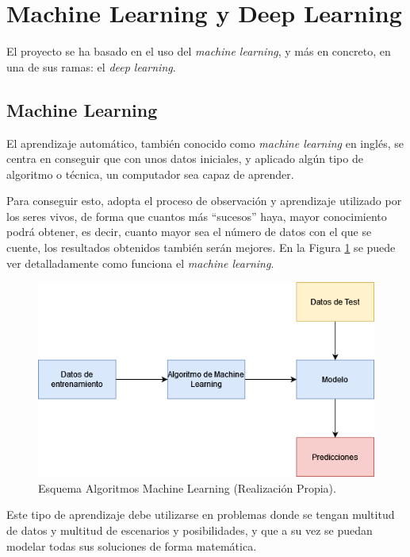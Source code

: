 
\section{Machine Learning y Deep Learning}
El proyecto se ha basado en el uso del \emph{machine learning}, y más en concreto, en una de sus ramas: el \emph{deep learning}.

\subsection{Machine Learning}
El aprendizaje automático, también conocido como \emph{machine learning} en inglés, \cite{bobadilla2021machine} se centra en conseguir que con unos datos iniciales, y aplicado algún tipo de algoritmo o técnica, un computador sea capaz de aprender.

Para conseguir esto, adopta el proceso de observación y aprendizaje utilizado por los seres vivos, de forma que cuantos más ``sucesos'' haya, mayor conocimiento podrá obtener, es decir, cuanto mayor sea el número de datos con el que se cuente, los resultados obtenidos también serán mejores. En la Figura \ref{f:esquemaML} se puede ver detalladamente como funciona el \emph{machine learning}.

\begin{figure}[h]
    \centering
    \includegraphics[scale=0.7]{img/Esquema_ML.png}
    \caption{Esquema Algoritmos Machine Learning (Realización Propia).}
    \label{f:esquemaML}
\end{figure}

Este tipo de aprendizaje debe utilizarse en problemas donde se tengan multitud de datos y multitud de escenarios y posibilidades, y que a su vez se puedan modelar todas sus soluciones de forma matemática.

